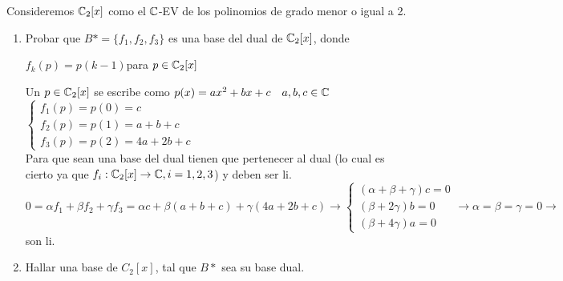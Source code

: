 \item Consideremos $\mathbb{C}_2[x]$ como el $\mathbb{C}$-EV de los polinomios de grado menor o igual a 2.
    \begin{enumerate}
        \item Probar que $B*=\{f_1,f_2,f_3\}$ es una base del dual de $\mathbb{C}_2[x]$, donde
            \begin{center}
                $f_k(p)=p(k-1)$\quad para $p\in\mathbb{C}_2[x]$
            \end{center}
            \begin{mdframed}[style=s]
                Un $p\in\mathbb{C}_2[x]$ se escribe como $p(x)=ax^2+bx+c\quad a,b,c\in\mathbb{C}$\\
                $\begin{cases}
                    f_1(p)=p(0)=c\\
                    f_2(p)=p(1)=a+b+c\\
                    f_3(p)=p(2)=4a+2b+c
                \end{cases}$\\
                Para que sean una base del dual tienen que pertenecer al dual (lo cual es cierto ya que $f_i:\mathbb{C}_2[x]\to\mathbb{C}, i=1,2,3$) y deben ser li.\\
                $0=\alpha f_1+\beta f_2+\gamma f_3=\alpha c+ \beta(a+b+c)+\gamma(4a+2b+c)\to \begin{cases}
                    (\alpha+\beta+\gamma)c=0\\
                    (\beta+2\gamma)b=0\\
                    (\beta+4\gamma)a=0
                \end{cases}\to\alpha=\beta=\gamma=0\to$ son li.
            \end{mdframed}
        \item Hallar una base de $C_2[x]$, tal que $B*$ sea su base dual.
\end{enumerate}
